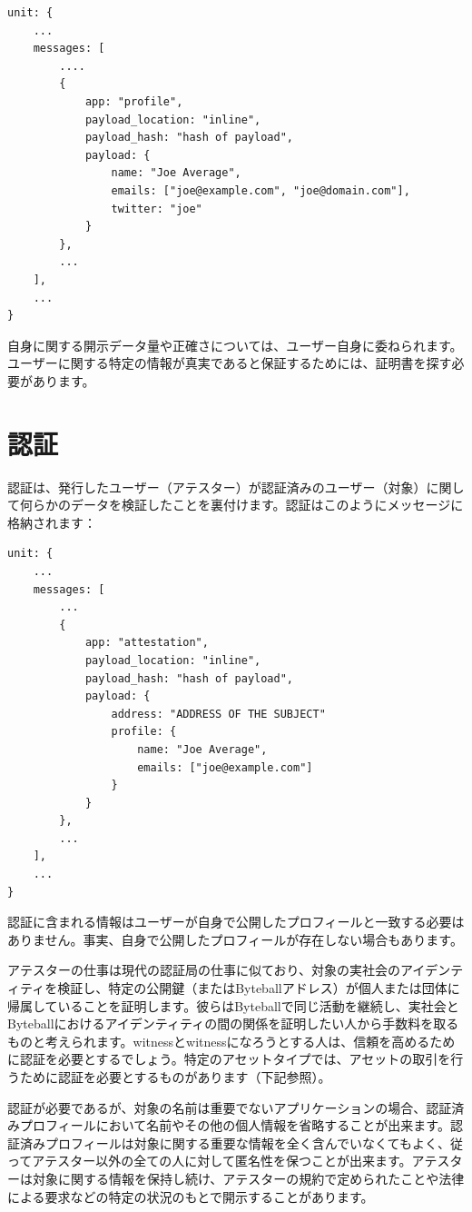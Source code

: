 \documentclass[a4paper, dvipdfmx]{jsarticle}
\begin{document}
\begin{lstlisting}[basicstyle=\ttfamily\footnotesize, frame=none]
unit: {
    ...
    messages: [
        ....
        {
            app: "profile",
            payload_location: "inline",
            payload_hash: "hash of payload",
            payload: {
                name: "Joe Average",
                emails: ["joe@example.com", "joe@domain.com"],
                twitter: "joe"
            }
        },
        ...
    ],
    ...
}
\end{lstlisting}

\noindent 自身に関する開示データ量や正確さについては、ユーザー自身に委ねられます。ユーザーに関する特定の情報が真実であると保証するためには、証明書を探す必要があります。


\section{認証}

認証は、発行したユーザー（アテスター）が認証済みのユーザー（対象）に関して何らかのデータを検証したことを裏付けます。認証はこのようにメッセージに格納されます：

\begin{lstlisting}[basicstyle=\ttfamily\footnotesize, frame=none]
unit: {
    ...
    messages: [
        ...
        {
            app: "attestation",
            payload_location: "inline",
            payload_hash: "hash of payload",
            payload: {
                address: "ADDRESS OF THE SUBJECT"
                profile: {
                    name: "Joe Average",
                    emails: ["joe@example.com"]
                }
            }
        },
        ...
    ],
    ...
}
\end{lstlisting}

認証に含まれる情報はユーザーが自身で公開したプロフィールと一致する必要はありません。事実、自身で公開したプロフィールが存在しない場合もあります。

アテスターの仕事は現代の認証局の仕事に似ており、対象の実社会のアイデンティティを検証し、特定の公開鍵（またはByteballアドレス）が個人または団体に帰属していることを証明します。彼らはByteballで同じ活動を継続し、実社会とByteballにおけるアイデンティティの間の関係を証明したい人から手数料を取るものと考えられます。witnessとwitnessになろうとする人は、信頼を高めるために認証を必要とするでしょう。特定のアセットタイプでは、アセットの取引を行うために認証を必要とするものがあります（下記参照）。

認証が必要であるが、対象の名前は重要でないアプリケーションの場合、認証済みプロフィールにおいて名前やその他の個人情報を省略することが出来ます。認証済みプロフィールは対象に関する重要な情報を全く含んでいなくてもよく、従ってアテスター以外の全ての人に対して匿名性を保つことが出来ます。アテスターは対象に関する情報を保持し続け、アテスターの規約で定められたことや法律による要求などの特定の状況のもとで開示することがあります。
\end{document}
